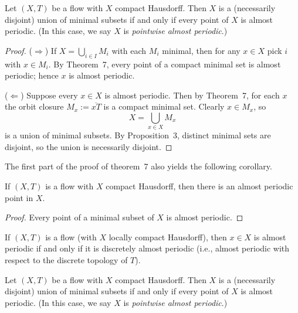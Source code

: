 \begin{corollary*}[10]
    Let $(X,T)$ be a flow with $X$ compact Hausdorff. Then $X$ is a (necessarily disjoint) union of minimal subsets if and only if every point of $X$ is almost periodic. (In this case, we say $X$ is \emph{pointwise almost periodic}.)
\end{corollary*}

\begin{mynote}
    \begin{proof}
        ($\Rightarrow$) If $X=\bigcup_{i\in I} M_i$ with each $M_i$ minimal, then for any $x\in X$ pick $i$ with $x\in M_i$.
        By Theorem~7, every point of a compact minimal set is almost periodic; hence $x$ is almost periodic.

        ($\Leftarrow$) Suppose every $x\in X$ is almost periodic. Then by Theorem~7, for each $x$ the orbit closure
        $M_x:=\overline{xT}$ is a compact minimal set. Clearly $x\in M_x$, so
        \[
            X=\bigcup_{x\in X} M_x
        \]
        is a union of minimal subsets. By Proposition~3, distinct minimal sets are disjoint, so the union is necessarily disjoint.
    \end{proof}
\end{mynote}

The first part of the proof of theorem~7 also yields the following corollary.

\begin{corollary*}[8]
    If $(X,T)$ is a flow with $X$ compact Hausdorff, then there is an almost periodic point in $X$.
\end{corollary*}

\begin{proof}
    Every point of a minimal subset of $X$ is almost periodic.
\end{proof}

\begin{corollary*}[9]
    If $(X,T)$ is a flow (with $X$ locally compact Hausdorff), then $x \in X$ is almost periodic if and only if it is discretely almost periodic (i.e., almost periodic with respect to the discrete topology of $T$).
\end{corollary*}

\begin{corollary*}[10]
    Let $(X,T)$ be a flow with $X$ compact Hausdorff. Then $X$ is a (necessarily disjoint) union of minimal subsets if and only if every point of $X$ is almost periodic. (In this case, we say $X$ is \emph{pointwise almost periodic}.)
\end{corollary*}

